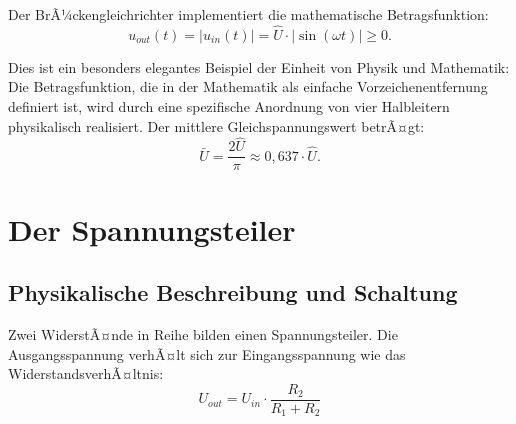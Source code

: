 ﻿\documentclass[12pt, a4paper]{article}
\begin{document}
	Der BrÃ¼ckengleichrichter implementiert die mathematische Betragsfunktion:
	\begin{equation}
		u_{out}(t) = \bigl|u_{in}(t)\bigr| = \hat{U} \cdot |\sin(\omega t)| \geq 0.
	\end{equation}
	
	Dies ist ein besonders elegantes Beispiel der Einheit von Physik und Mathematik: Die Betragsfunktion, die in der Mathematik als einfache Vorzeichenentfernung definiert ist, wird durch eine spezifische Anordnung von vier Halbleitern physikalisch realisiert. Der mittlere Gleichspannungswert betrÃ¤gt:
	\begin{equation}
		\bar{U} = \frac{2\hat{U}}{\pi} \approx 0{,}637 \cdot \hat{U}.
	\end{equation}
	
	\section{Der Spannungsteiler}
	
	\subsection{Physikalische Beschreibung und Schaltung}
	
	Zwei WiderstÃ¤nde in Reihe bilden einen Spannungsteiler. Die Ausgangsspannung verhÃ¤lt sich zur Eingangsspannung wie das WiderstandsverhÃ¤ltnis:
	\begin{equation}
		U_{out} = U_{in} \cdot \frac{R_2}{R_1 + R_2}
	\end{equation}
	
\end{document}

